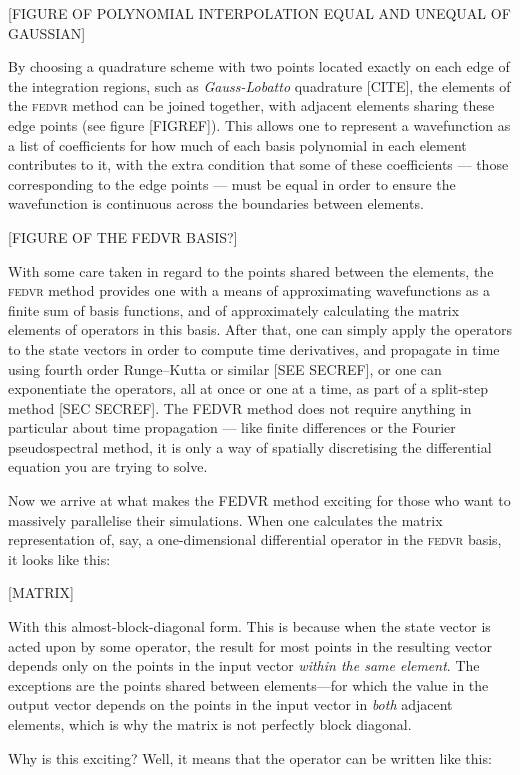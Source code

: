 [FIGURE OF POLYNOMIAL INTERPOLATION EQUAL AND UNEQUAL OF GAUSSIAN]

By choosing a quadrature scheme with two points located exactly on each edge of the integration regions, such as \emph{Gauss-Lobatto} quadrature [CITE], the elements of the \textsc{fedvr} method can be joined together, with adjacent elements sharing these edge points (see figure [FIGREF]). This allows one to represent a wavefunction as a list of coefficients for how much of each basis polynomial in each element contributes to it, with the extra condition that some of these coefficients --- those corresponding to the edge points --- must be equal in order to ensure the wavefunction is continuous across the boundaries between elements.

[FIGURE OF THE FEDVR BASIS?]

With some care taken in regard to the points shared between the elements, the \textsc{fedvr} method provides one with a means of approximating wavefunctions as a finite sum of basis functions, and of approximately calculating the matrix elements of operators in this basis. After that, one can simply apply the operators to the state vectors in order to compute time derivatives, and propagate in time using fourth order Runge--Kutta or similar [SEE SECREF], or one can exponentiate the operators, all at once or one at a time, as part of a split-step method [SEC SECREF]. The \textsc{FEDVR} method does not require anything in particular about time propagation --- like finite differences or the Fourier pseudospectral method, it is only a way of spatially discretising the differential equation you are trying to solve.

Now we arrive at what makes the \textsc{FEDVR} method exciting for those who want to massively parallelise their simulations. When one calculates the matrix representation of, say, a one-dimensional differential operator in the \textsc{fedvr} basis, it looks like this:

[MATRIX]

With this almost-block-diagonal form. This is because when the state vector is acted upon by some operator, the result for most points in the resulting vector depends only on the points in the input vector \emph{within the same element}. The exceptions are the points shared between elements---for which the value in the output vector depends on the points in the input vector in \emph{both} adjacent elements, which is why the matrix is not perfectly block diagonal.

Why is this exciting? Well, it means that the operator can be written like this:

